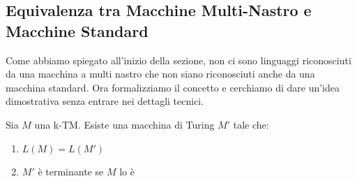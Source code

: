 \subsection{Equivalenza tra Macchine Multi-Nastro e Macchine Standard} \label{dimo}
Come abbiamo spiegato all'inizio della sezione, non ci sono linguaggi riconosciuti da una macchina a multi nastro che non siano riconosciuti anche da una macchina standard.
Ora formalizziamo il concetto e cerchiamo di dare un'idea dimostrativa senza entrare nei dettagli tecnici. \smallskip\\
\colorbox{SALZO}{\parbox{\dimexpr\linewidth-2\fboxsep}{\begin{lemma}
   Sia $M$ una k-TM. Esiste una macchina di Turing $M'$ tale che:
   \begin{enumerate}
    \item $L(M) = L(M')$
    \item $M'$ è terminante se $M$ lo è
   \end{enumerate}
\end{lemma}}}
